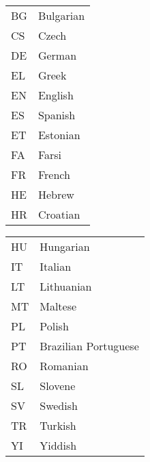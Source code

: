 \documentclass[output=paper,
modfonts,
]{langscibook}
\begin{document}
\begin{table}
\begin{tabularx}{.45\textwidth}{ll}
\textsc{BG} & Bulgarian \\
\textsc{CS} & Czech \\
\textsc{DE} & German \\
\textsc{EL} & Greek \\
\textsc{EN} & English \\
\textsc{ES} & Spanish \\
\textsc{ET} & Estonian \\
\textsc{FA} & Farsi \\
\textsc{FR} & French \\
\textsc{HE} & Hebrew \\
\textsc{HR} & Croatian 
\end{tabularx}
\begin{tabularx}{.45\textwidth}{ll}
\textsc{HU} & Hungarian \\
\textsc{IT} & Italian \\
\textsc{LT} & Lithuanian \\
\textsc{MT} & Maltese \\
\textsc{PL} & Polish \\
\textsc{PT} & Brazilian Portuguese \\
\textsc{RO} & Romanian \\
\textsc{SL} & Slovene \\
\textsc{SV} & Swedish \\
\textsc{TR} & Turkish \\
\textsc{YI} & Yiddish \\
\end{tabularx}
\end{table}


\printbibliography[heading=subbibliography,notkeyword=this]
\end{document}
